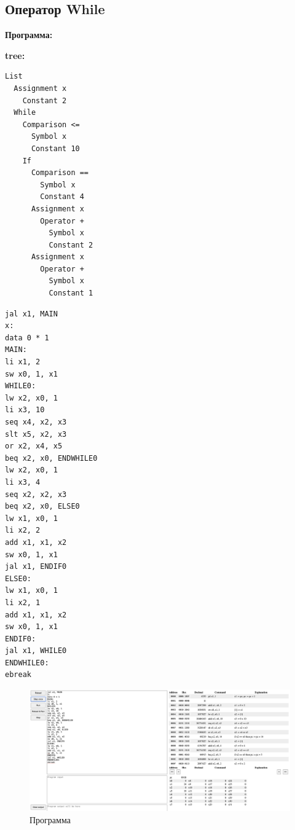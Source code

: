 \documentclass[12pt,onecolumn]{article}
\begin{document}
\subsection{Оператор While}
\textbf{Программа:}

\textbf{tree:}
\begin{verbatim}
List
  Assignment x
    Constant 2
  While
    Comparison <=
      Symbol x
      Constant 10
    If
      Comparison ==
        Symbol x
        Constant 4
      Assignment x
        Operator +
          Symbol x
          Constant 2
      Assignment x
        Operator +
          Symbol x
          Constant 1

\end{verbatim}
\begin{verbatim}
jal x1, MAIN
x:
data 0 * 1
MAIN:
li x1, 2
sw x0, 1, x1
WHILE0:
lw x2, x0, 1
li x3, 10
seq x4, x2, x3
slt x5, x2, x3
or x2, x4, x5
beq x2, x0, ENDWHILE0
lw x2, x0, 1
li x3, 4
seq x2, x2, x3
beq x2, x0, ELSE0
lw x1, x0, 1
li x2, 2
add x1, x1, x2
sw x0, 1, x1
jal x1, ENDIF0
ELSE0:
lw x1, x0, 1
li x2, 1
add x1, x1, x2
sw x0, 1, x1
ENDIF0:
jal x1, WHILE0
ENDWHILE0:
ebreak
\end{verbatim}


\begin{figure}[H]
    \centering
    \includegraphics[width=\textwidth]{image/out4.png}
    \caption{Программа}
\end{figure}
\end{document}
